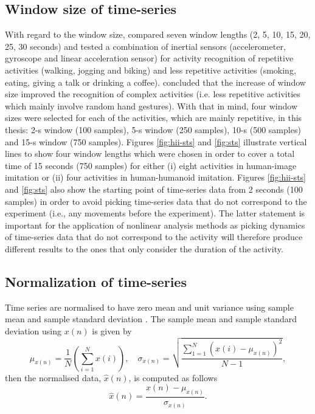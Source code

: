 \subsection{Window size of time-series}
With regard to the window size, \cite{shoaib2016} compared 
seven window lengths (2, 5, 10, 15, 20, 25, 30 seconds)
and tested a combination of inertial sensors (accelerometer, gyroscope and linear 
acceleration sensor) for activity recognition of repetitive 
activities (walking, jogging and biking) and less repetitive activities 
(smoking, eating, giving a talk or drinking a coffee).
\cite{shoaib2016} concluded that the increase of window size 
improved the recognition of complex activities (i.e. less repetitive 
activities which mainly involve random hand gestures).
With that in mind, four window sizes were selected 
for each of the activities, which are mainly repetitive, in this thesis: 
2-s window (100 samples), 
5-s window (250 samples), 
10-s (500 samples) and 
15-s window (750 samples).
Figures \ref{fig:hii-sts} and \ref{fig:sts} illustrate  
vertical lines to show four window lengths which 
were chosen in order to cover a total time of 15 seconds (750 samples)
for either
(i) eight activities in human-image imitation 
or (ii) four activities in human-humanoid imitation.
Figures \ref{fig:hii-sts} and \ref{fig:sts} also show 
the starting point of time-series data from 2 seconds (100 samples) 
in order to avoid picking time-series data 
that do not correspond to the experiment 
(i.e., any movements before the experiment).
The latter statement is important for the application of
nonlinear analysis methods as picking dynamics of time-series data 
that do not correspond to the activity
will therefore produce different results to the ones 
that only consider the duration of the activity. 

\subsection{Normalization of time-series}
Time series are normalised to have zero mean and unit variance 
using sample mean and sample standard deviation \citep{loffe2015}.
The sample mean and sample standard deviation using $x(n)$ is given by
\begin{equation}\label{eq:ms}
\mu_{x(n)}= 
	\frac{1}{N} ( \sum_{i=1}^N x(i) ), \quad  
	\sigma_{x(n)} =  
	\sqrt{ \frac{  \sum_{1=1}^N ( x(i) - \mu_{x(n)} )^2 }{ N-1 }  },      
\end{equation}
then the normalised data, $\hat{x}(n)$, is computed as follows
\begin{equation}\label{eq:normalization}
\hat{x} (n) = \frac{   x(n) -  \mu_{x(n)}  }{   \sigma_{x(n)} }.   
\end{equation}

